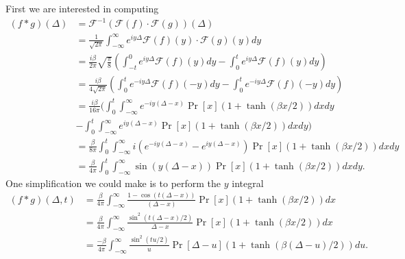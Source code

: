 \documentclass[
 amsmath,amssymb,
 aps,
onecolumn, 
nofootinbib]{revtex4-2}
\begin{document}
First we are interested in computing 
\begin{align}
    (f * g)(\Delta) &= \mathcal{F}^{-1}(\mathcal{F}(f) \cdot \mathcal{F}(g))(\Delta) \\
    &= \frac{1}{\sqrt{2 \pi}} \int_{-\infty}^{\infty} e^{i y \Delta} \mathcal{F}(f)(y) \cdot \mathcal{F}(g)(y) dy \\
    &= \frac{i \beta}{2 \pi} \sqrt{\frac{\pi}{8}} \left(\int_{-t}^0 e^{i y \Delta} \mathcal{F}(f)(y) dy - \int_{0}^t e^{i y \Delta} \mathcal{F}(f)(y) dy  \right) \\
    &= \frac{ i \beta}{4 \sqrt{2 \pi}} \left(\int_0^t e^{- i y \Delta} \mathcal{F}(f)(-y) dy - \int_{0}^{t} e^{-i y \Delta} \mathcal{F}(f)(- y) dy \right) \\
    &= \frac{i \beta}{16 \pi} \bigg( \int_{0}^t \int_{- \infty}^{\infty} e^{-i y (\Delta - x)} \Pr[x] (1 + \tanh(\beta x / 2)) dx dy \\
    &- \int_{0}^t \int_{- \infty}^{\infty} e^{i y (\Delta - x)} \Pr[x] (1 + \tanh(\beta x / 2)) dx dy \bigg) \\
    &= \frac{\beta}{8 \pi} \int_{0}^t \int_{- \infty }^{\infty} i\left(e^{-i y (\Delta - x)} - e^{i y(\Delta - x)}\right) \Pr[x] (1 + \tanh(\beta x /2)) dx dy \\
    &= \frac{\beta}{4 \pi} \int_{0}^t \int_{- \infty }^{\infty} \sin( y (\Delta - x)) \Pr[x] (1 + \tanh(\beta x /2)) dx dy. 
\end{align}
One simplification we could make is to perform the $y$ integral
\begin{align}
    (f * g)(\Delta, t) &= \frac{\beta}{4 \pi} \int_{- \infty }^{\infty} \frac{1 - \cos( t (\Delta - x))}{(\Delta - x)} \Pr[x] (1 + \tanh(\beta x /2)) dx \\
    &= \frac{\beta}{4\pi} \int_{-\infty}^{\infty} \frac{\sin^2 (t (\Delta - x) / 2)}{\Delta - x} \Pr[x] (1 + \tanh(\beta x / 2)) dx \\
    &= \frac{-\beta}{4 \pi} \int_{-\infty}^{\infty} \frac{\sin^2(t u / 2)}{u} \Pr[\Delta - u] (1 + \tanh(\beta (\Delta - u)/2)) du.
\end{align}
\end{document}
